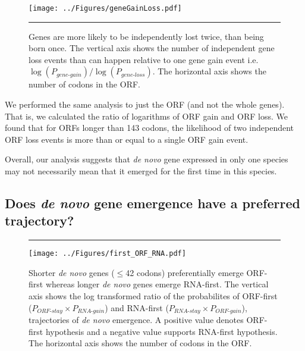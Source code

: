 \documentclass[12pt,a4paper]{article}
\begin{document}
\begin{figure}[!t]
\centering
\texttt{[image: ../Figures/geneGainLoss.pdf]}
\caption{Genes are more likely to be independently lost twice, than being born once. The vertical axis shows the number of independent gene loss events than can happen relative to one gene gain event i.e. $\log(P_\textit{gene-gain})/\log(P_\textit{gene-loss})$. The horizontal axis shows the number of codons in the ORF.}
\label{gainlossprob}

\vspace{1em}
\hrule
\end{figure}

We performed the same analysis to just the ORF (and not the whole genes). That is, we calculated the ratio of logarithms of ORF gain and ORF loss. We found that for ORFs longer than 143 codons, the likelihood of two independent ORF loss events is more than or equal to a single ORF gain event. 

Overall, our analysis suggests that \textit{de novo} gene expressed in only one species may not necessarily mean that it emerged for the first time in this species. 

\subsection{Does \textit{de novo} gene emergence have a preferred trajectory?}

\begin{figure}[!b]
\hrule
\vspace{1ex}
\centering
\texttt{[image: ../Figures/first\_ORF\_RNA.pdf]}
\caption{Shorter \textit{de novo} genes ($\leq$42 codons) preferentially emerge ORF-first whereas longer \textit{de novo} genes emerge RNA-first. The vertical axis shows the log transformed ratio of the probabilites of ORF-first ($P_\textit{ORF-stay}\times P_\textit{RNA-gain}$) and RNA-first ($P_\textit{RNA-stay}\times P_\textit{ORF-gain}$), trajectories of \textit{de novo} emergence. A positive value denotes ORF-first hypothesis and a negative value supports RNA-first hypothesis. The horizontal axis shows the number of codons in the ORF.}
\label{whoisfirst}
\end{figure}
\end{document}
